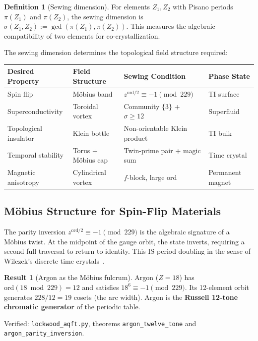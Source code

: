 \documentclass[12pt,oneside]{article}
\theoremstyle{principia}
\theoremstyle{definition}
\newtheorem{definition}[theorem]{Definition}
\newtheorem{result}[theorem]{Result}
\theoremstyle{remark}
\begin{document}
\begin{definition}[Sewing dimension]
For elements $Z_1, Z_2$ with Pisano periods $\pi(Z_1)$ and $\pi(Z_2)$, the sewing dimension is $\sigma(Z_1, Z_2) := \gcd(\pi(Z_1), \pi(Z_2))$. This measures the algebraic compatibility of two elements for co-crystallization.
\end{definition}

The sewing dimension determines the topological field structure required:

\begin{center}
\begin{tabular}{@{}llll@{}}
\toprule
\textbf{Desired Property} & \textbf{Field Structure} & \textbf{Sewing Condition} & \textbf{Phase State} \\
\midrule
Spin flip & M\"obius band & $z^{\mathrm{ord}/2} \equiv -1 \pmod{229}$ & TI surface \\
Superconductivity & Toroidal vortex & Community $\{3\}$ + $\sigma \geq 12$ & Superfluid \\
Topological insulator & Klein bottle & Non-orientable Klein product & TI bulk \\
Temporal stability & Torus + M\"obius cap & Twin-prime pair + magic sum & Time crystal \\
Magnetic anisotropy & Cylindrical vortex & $f$-block, large ord & Permanent magnet \\
\bottomrule
\end{tabular}
\end{center}

\subsection{M\"obius Structure for Spin-Flip Materials}

The parity inversion $z^{\mathrm{ord}/2} \equiv -1 \pmod{229}$ is the algebraic signature of a M\"obius twist. At the midpoint of the gauge orbit, the state inverts, requiring a second full traversal to return to identity. This IS period doubling in the sense of Wilczek's discrete time crystals~\cite{wilczek2012}.

\begin{result}[Argon as the M\"obius fulcrum]
Argon ($Z = 18$) has $\mathrm{ord}(18 \bmod 229) = 12$ and satisfies $18^6 \equiv -1 \pmod{229}$. Its 12-element orbit generates $228/12 = 19$ cosets (the arc width). Argon is the \textbf{Russell 12-tone chromatic generator} of the periodic table.

Verified: \texttt{lockwood\_aqft.py}, theorems \texttt{argon\_twelve\_tone} and \texttt{argon\_parity\_inversion}.
\end{result}
\end{document}
